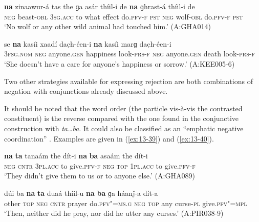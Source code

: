 \begin{exe}
\ex
\label{ex:13-37}
\gll \textbf{na} zinaawur-á tas the ɡa asár thíil-i de \textbf{na} ɡhrast-á thíil-i de \\
\textsc{neg} beast-\textsc{obl} \textsc{3sg.acc} to what effect do.\textsc{pfv-f} \textsc{pst}  \textsc{neg} wolf-\textsc{obl} do.\textsc{pfv-f} \textsc{pst} \\
\glt `No wolf or any other wild animal had touched him.' (A:GHA014)

\ex
\label{ex:13-38}
\gll se {\ob}\textbf{na} kasíi xaadí dac̣h-éen-i \textbf{na} kasíi marɡ dac̣h-éen-i{\cb}\\
\textsc{3fsg.nom} \textsc{neg} anyone.\textsc{gen} happiness look-\textsc{prs-f}  \textsc{neg} anyone.\textsc{gen} death look-\textsc{prs-f}  \\
\glt `She doesn't have a care for anyone's happiness or sorrow.' (A:KEE005-6) 
\end{exe}

Two other strategies available for expressing rejection are both combinations of negation with conjunctions already discussed above.


 It should be noted that the word order (the particle vis-à-vis the contrasted constituent) is the reverse compared with the one found in the conjunctive construction with \textit{ta{\ldots}ba}. It could also be classified as an ``emphatic negative coordination'' \citep[17--19]{haspelmath2007}. Examples are given in (\ref{ex:13-39}) and (\ref{ex:13-40}).

\begin{exe}
\ex
\label{ex:13-39}
\gll \textbf{na} \textbf{ta} tanaám the dít-i \textbf{na} \textbf{ba} asaám the dít-i \\
\textsc{neg} \textsc{cntr} \textsc{3pl.acc} to give.\textsc{pfv-f} \textsc{neg} \textsc{top} \textsc{1pl.acc} to give.\textsc{pfv-f}  \\
\glt `They didn't give them to us or to anyone else.' (A:GHA089)

\ex
\label{ex:13-40}
\gll dúi ba {\ob}\textbf{na} \textbf{ta} duaá thíil-u \textbf{na} \textbf{ba} ɡa háanǰ-a dít-a{\cb}\\
other \textsc{top} \textsc{neg} \textsc{cntr} prayer do.\textsc{pfv"=ms.g} \textsc{neg} \textsc{top} any curse-\textsc{pl} give.\textsc{pfv"=mpl}\\
\glt `Then, neither did he pray, nor did he utter any curses.' (A:PIR038-9) 
\end{exe}

